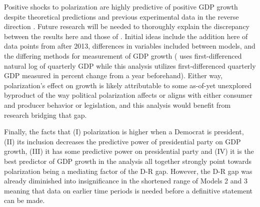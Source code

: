 \documentclass[a4paper, 12pt]{article}
\begin{document}
Positive shocks to polarization are highly predictive of positive GDP growth despite theoretical predictions and previous experimental data in the reverse direction \cite{azzimonti2013, azzimontiTalbert2014, bakerBloomDavis2016}. Future research will be needed to thoroughly explain the discrepancy between the results here and those of \citeauthor{azzimonti2013}. Initial ideas include the addition here of data points from after 2013, differences in variables included between models, and the differing methods for measurement of GDP growth (\citeauthor{azzimonti2013} uses first-differenced natural log of quarterly GDP while this analysis utilizes first-differenced quarterly GDP measured in percent change from a year beforehand). Either way, polarization's effect on growth is likely attributable to some as-of-yet unexplored byproduct of the way political polarization affects or aligns with either consumer and producer behavior or legislation, and this analysis would benefit from research bridging that gap. \par
Finally, the facts that (I) polarization is higher when a Democrat is president, (II) its inclusion decreases the predictive power of presidential party on GDP growth, (III) it has some predictive power on presidential party and (IV) it is the best predictor of GDP growth in the analysis all together strongly point towards polarization being a mediating factor of the D-R gap. However, the D-R gap was already diminished into insignificance in the shortened range of Models 2 and 3 meaning that data on earlier time periods is needed before a definitive statement can be made.

\newpage


\end{document}

